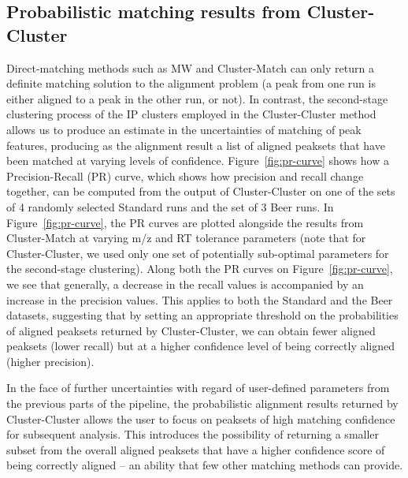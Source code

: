 
\subsection{Probabilistic matching results from Cluster-Cluster}

Direct-matching methods such as MW and Cluster-Match can only return a definite matching solution to the alignment problem (a peak from one run is either aligned to a peak in the other run, or not). In contrast, the second-stage clustering process of the IP clusters employed in the Cluster-Cluster method allows us to produce an estimate in the uncertainties of matching of peak features, producing as the alignment result a list of aligned peaksets that have been matched at varying levels of confidence. Figure~\ref{fig:pr-curve} shows how a Precision-Recall (PR) curve, which shows how precision and recall change together, can be computed from the output of Cluster-Cluster on one of the sets of 4 randomly selected Standard runs and the set of 3 Beer runs. In Figure~\ref{fig:pr-curve}, the PR curves are plotted alongside the results from Cluster-Match at varying m/z and RT tolerance parameters (note that for Cluster-Cluster, we used only one set of potentially sub-optimal parameters for the second-stage clustering). Along both the PR curves on Figure~\ref{fig:pr-curve}, we see that generally, a decrease in the recall values is accompanied by an increase in the precision values. This applies to both the Standard and the Beer datasets, suggesting that by setting an appropriate threshold on the probabilities of aligned peaksets returned by Cluster-Cluster, we can obtain fewer aligned peaksets (lower recall) but at a higher confidence level of being correctly aligned (higher precision).

In the face of further uncertainties with regard of user-defined parameters from the previous parts of the pipeline, the probabilistic alignment results returned by Cluster-Cluster allows the user to focus on peaksets of high matching confidence for subsequent analysis.  This introduces the possibility of returning a smaller subset from the overall aligned peaksets that have a higher confidence score of being correctly aligned -- an ability that few other matching methods can provide.


